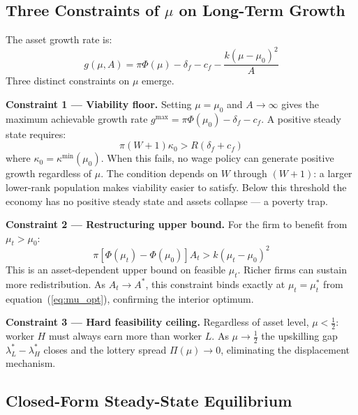 \documentclass[12pt,a4paper]{article}
\begin{document}
\subsection{Three Constraints of $\mu$ on Long-Term Growth}

The asset growth rate is:
\begin{equation}
  g(\mu, A) = \pi\Phi(\mu) - \delta_f - c_f
              - \frac{k(\mu-\mu_0)^2}{A}
  \label{eq:growth_rate}
\end{equation}
Three distinct constraints on $\mu$ emerge.

\textbf{Constraint 1 --- Viability floor.}
Setting $\mu = \mu_0$ and $A \to \infty$ gives the maximum achievable
growth rate $g^{\max} = \pi\Phi(\mu_0) - \delta_f - c_f$. A positive
steady state requires:
\begin{equation}
  \boxed{\pi(W+1)\kappa_0 > R(\delta_f + c_f)}
  \label{eq:viability}
\end{equation}
where $\kappa_0 = \kappa^{\min}(\mu_0)$. When this fails, no wage
policy can generate positive growth regardless of $\mu$. The condition
depends on $W$ through $(W+1)$: a larger lower-rank population makes
viability easier to satisfy. Below this threshold the economy has no
positive steady state and assets collapse --- a poverty trap.

\textbf{Constraint 2 --- Restructuring upper bound.}
For the firm to benefit from $\mu_t > \mu_0$:
\begin{equation}
  \pi[\Phi(\mu_t)-\Phi(\mu_0)]A_t > k(\mu_t-\mu_0)^2
  \label{eq:upper_bound}
\end{equation}
This is an asset-dependent upper bound on feasible $\mu_t$. Richer
firms can sustain more redistribution. As $A_t \to A^*$, this
constraint binds exactly at $\mu_t = \mu_t^*$ from
equation~(\ref{eq:mu_opt}), confirming the interior optimum.

\textbf{Constraint 3 --- Hard feasibility ceiling.}
Regardless of asset level, $\mu < \tfrac{1}{2}$: worker $H$ must
always earn more than worker $L$. As $\mu \to \tfrac{1}{2}$ the
upskilling gap $\lambda_L^* - \lambda_H^*$ closes and the lottery
spread $\Pi(\mu) \to 0$, eliminating the displacement mechanism.

\subsection{Closed-Form Steady-State Equilibrium}
\end{document}
